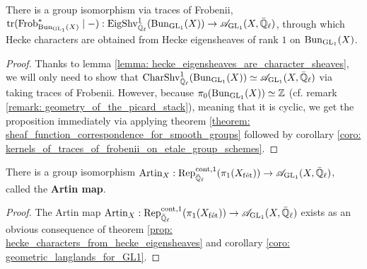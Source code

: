             \begin{proposition} \label{prop: hecke_characters_from_hecke_eigensheaves}
                There is a group isomorphism via traces of Frobenii, $\operatorname{tr}(\mathrm{Frob}_{\mathrm{Bun}_{\operatorname{GL}_1}(X)}^* \mid -): \mathrm{Eig}\mathrm{Shv}_{\bar{\mathbb{Q}}_{\ell}}^1(\mathrm{Bun}_{\operatorname{GL}_1}(X)) \to \mathscr{A}_{\operatorname{GL}_1}(X, \bar{\mathbb{Q}}_{\ell})$, through which Hecke characters are obtained from Hecke eigensheaves of rank $1$ on $\mathrm{Bun}_{\operatorname{GL}_1}(X)$.
            \end{proposition}
                \begin{proof}
                    Thanks to lemma \ref{lemma: hecke_eigensheaves_are_character_sheaves}, we will only need to show that $\mathrm{Char}\mathrm{Shv}_{\bar{\mathbb{Q}}_{\ell}}^1(\mathrm{Bun}_{\operatorname{GL}_1}(X)) \simeq \mathscr{A}_{\operatorname{GL}_1}(X, \bar{\mathbb{Q}}_{\ell})$ via taking traces of Frobenii. However, because $\pi_0(\mathrm{Bun}_{\operatorname{GL}_1}(X)) \simeq \mathbb{Z}$ (cf. remark \ref{remark: geometry_of_the_picard_stack}), meaning that it is cyclic, we get the proposition immediately via applying theorem \ref{theorem: sheaf_function_correspondence_for_smooth_groups} followed by corollary \ref{coro: kernels_of_traces_of_frobenii_on_etale_group_schemes}.
                \end{proof}
            
            \begin{theorem} \label{theorem: artin_reciprocity_for_function_fields_over_finite_fields}
                \cite[Theorem VI.5.5]{neukirch_2010_algebraic_number_theory} There is a group isomorphism $\mathrm{Artin}_X: \mathrm{Rep}^{\mathrm{cont}, 1}_{\bar{\mathbb{Q}}_{\ell}}(\pi_1(X_{\mathrm{f\acute{e}t}})) \to \mathscr{A}_{\operatorname{GL}_1}(X, \bar{\mathbb{Q}}_{\ell})$, called the \textbf{Artin map}.
            \end{theorem}
                \begin{proof}
                    The Artin map $\mathrm{Artin}_X: \mathrm{Rep}^{\mathrm{cont}, 1}_{\bar{\mathbb{Q}}_{\ell}}(\pi_1(X_{\mathrm{f\acute{e}t}})) \to \mathscr{A}_{\operatorname{GL}_1}(X, \bar{\mathbb{Q}}_{\ell})$ exists as an obvious consequence of theorem \ref{prop: hecke_characters_from_hecke_eigensheaves} and corollary \ref{coro: geometric_langlands_for_GL1}. 
                \end{proof}
                
